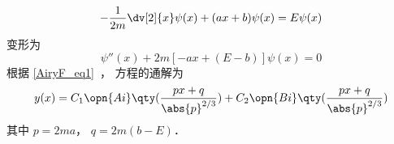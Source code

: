

\begin{equation}
-\frac{1}{2m}\dv[2]{x}\psi(x) + (ax + b)\psi(x) = E\psi(x)
\end{equation}
变形为
\begin{equation}
\psi''(x) + 2m[-ax + (E-b)]\psi(x) = 0
\end{equation}
根据 \autoref{AiryF_eq1}~， 方程的通解为
\begin{equation}
y(x) = C_1\opn{Ai}\qty(\frac{px+q}{\abs{p}^{2/3}}) + C_2 \opn{Bi}\qty(\frac{px+q}{\abs{p}^{2/3}})
\end{equation}
其中 $p = 2ma$， $q = 2m(b - E)$．
